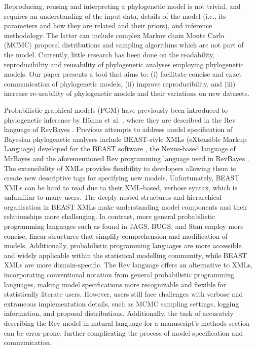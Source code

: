 \documentclass[10pt,letterpaper,table]{article}
\theoremstyle{definition}
\begin{document}
Reproducing, reusing and interpreting a phylogenetic model is not trivial, and requires an understanding of the input data, details of the model (i.e., its parameters and how they are related and their priors), and inference methodology. 
The latter can include complex Markov chain Monte Carlo (MCMC) proposal distributions and sampling algorithms which are not part of the model.
Currently, little research has been done on the readability, reproducibility and reusability of phylogenetic analyses employing phylogenetic models. 
Our paper presents a tool that aims to: (i) facilitate concise and exact communication of phylogenetic models, (ii) improve reproducibility, and (iii) increase re-usability of phylogenetic models and their variations on new datasets. 

Probabilistic graphical models (PGM) have previously been introduced to phylogenetic inference by H\"{o}hna et al. \cite{revbayes}, where they are described in the Rev language of RevBayes \cite{revbayes}. 
Previous attempts to address model specification of Bayesian phylogenetic analyses include BEAST-style XMLs (eXtensible Markup Language) developed for the BEAST software \cite{beast,beast2}, the Nexus-based language of MrBayes \cite{mrbayes} and the aforementioned Rev programming language used in RevBayes \cite{revbayes}. 
The extensibility of XMLs provides flexibility to developers allowing them to create new descriptive tags for specifying new models.
Unfortunately, BEAST XMLs can be hard to read due to their XML-based, verbose syntax, which is unfamiliar to many users. The deeply nested structures and hierarchical organisation in BEAST XMLs make understanding model components and their relationships more challenging. In contrast, more general probabilistic programming languages such as found in JAGS, BUGS, and Stan employ more concise, linear structures that simplify comprehension and modification of models. Additionally, probabilistic programming languages are more accessible and widely applicable within the statistical modelling community, while BEAST XMLs are more domain-specific. 
The Rev language \cite{revbayes} offers an alternative to XMLs, incorporating conventional notation from general probabilistic programming languages, making model specifications more recognizable and flexible for statistically literate users. 
However, users still face challenges with verbose and extraneous implementation details, such as MCMC sampling settings, logging information, and proposal distributions. 
Additionally, the task of accurately describing the Rev model in natural language for a manuscript's methods section can be error-prone, further complicating the process of model specification and communication.
\end{document}
